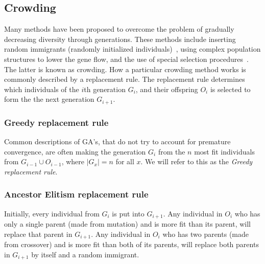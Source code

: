 \subsection{Crowding}
Many methods have been proposed to overcome the problem of gradually decreasing diversity through generations. These methods include inserting random immigrants (randomly initialized individuals)~\cite{Cobb93geneticalgorithms}, using complex population structures to lower the gene flow, and the use of special selection procedures~\cite{ursem2002diversity}. The latter is known as crowding. How a particular crowding method works is commonly described by a replacement rule.
The replacement rule determines which individuals of the $i$th generation $G_i$,
and their offspring $O_i$ is selected to form the the next generation $G_{i+1}$.

\subsubsection{Greedy replacement rule}
Common descriptions of GA's, that do not try to account for premature convergence,
are often making the generation $G_i$ from the $n$ most fit individuals from $G_{i-1} \cup O_{i-1}$,
where $\lvert G_x \rvert = n$ for all $x$\cite{ma.sterThesisGANN}.
We will refer to this as the \emph{Greedy replacement rule}.

%
%

\subsubsection{Ancestor Elitism replacement rule}
Initially, every individual from $G_i$ is put into $G_{i+1}$.
Any individual in $O_i$ who has only a single parent (made from mutation) and is more fit than its parent, will replace that parent in $G_{i+1}$.
Any individual in $O_i$ who has two parents (made from crossover) and is more fit than both of its parents, will replace both parents in $G_{i+1}$ by itself and a random immigrant.


